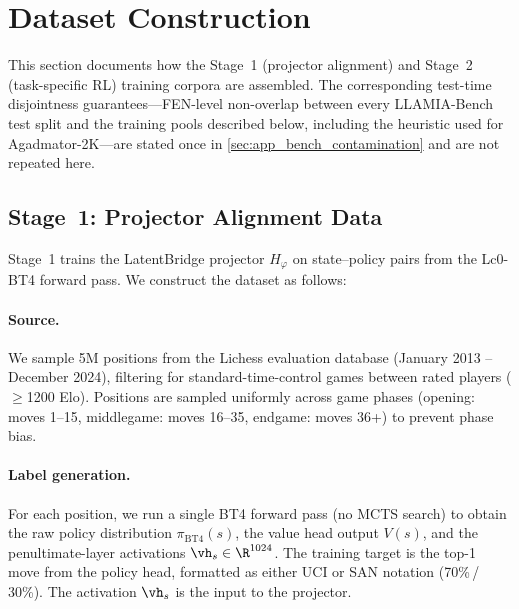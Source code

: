 \section{Dataset Construction}
\label{sec:app_data}

This section documents how the Stage~1 (projector alignment) and Stage~2 (task-specific RL) training corpora are assembled. The corresponding test-time disjointness guarantees---FEN-level non-overlap between every LLAMIA-Bench test split and the training pools described below, including the heuristic used for Agadmator-2K---are stated once in \cref{sec:app_bench_contamination} and are not repeated here.

\subsection{Stage~1: Projector Alignment Data}
\label{sec:app_data_stage1}


Stage~1 trains the LatentBridge projector $H_\varphi$ on state--policy pairs from the Lc0-BT4 forward pass. We construct the dataset as follows:

\paragraph{Source.} We sample 5M positions from the Lichess evaluation database (January 2013 -- December 2024), filtering for standard-time-control games between rated players ($\geq$1200 Elo). Positions are sampled uniformly across game phases (opening: moves 1--15, middlegame: moves 16--35, endgame: moves 36+) to prevent phase bias.

\paragraph{Label generation.} For each position, we run a single BT4 forward pass (no MCTS search) to obtain the raw policy distribution $\pi_\text{BT4}(s)$, the value head output $V(s)$, and the penultimate-layer activations $\vh_s \in \R^{1024}$. The training target is the top-1 move from the policy head, formatted as either UCI or SAN notation (70\%\,/\,30\%). The activation $\vh_s$ is the input to the projector.

